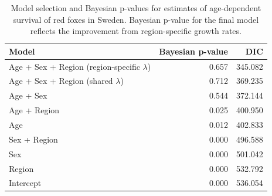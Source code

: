 
\begin{table}[!htbp]
  \centering
  \captionsetup{font=scriptsize}
  \caption{Model selection and Bayesian p-values for estimates of age-dependent
    survival of red foxes in Sweden. Bayesian p-value for the final model reflects the improvement from region-specific
    growth rates.}
  \label{table:DICBP}
  \scriptsize
  \begin{tabular}{lrr}
    \toprule
    Model                                          & Bayesian p-value & DIC     \\
    \midrule
    Age + Sex + Region (region-specific $\lambda$) & 0.657            & 345.082 \\
    Age + Sex + Region (shared $\lambda$)          & 0.712            & 369.235 \\
    Age + Sex                                      & 0.544            & 372.144 \\
    Age + Region                                   & 0.025            & 400.950 \\
    Age                                            & 0.012            & 402.833 \\
    Sex + Region                                   & 0.000            & 496.588 \\
    Sex                                            & 0.000            & 501.042 \\
    Region                                         & 0.000            & 532.792 \\
    Intercept                                      & 0.000            & 536.054 \\
    \bottomrule
  \end{tabular}
\end{table}


